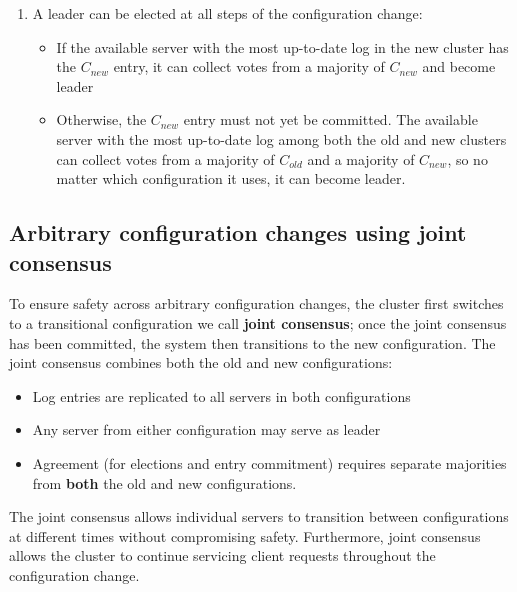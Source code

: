 \documentclass[11pt]{article}
\begin{document}
\begin{enumerate}
\item A leader can be elected at all steps of the configuration change:
\begin{itemize}
\item If the available server with the most up-to-date log in the new cluster has the \(C_{new}\)
entry, it can collect votes from a majority of \(C_{new}\) and become leader
\item Otherwise, the \(C_{new}\) entry must not yet be committed. The available server with the most
up-to-date log among both the old and new clusters can collect votes from a majority of
\(C_{old}\) and a majority of \(C_{new}\), so no matter which configuration it uses, it can
become leader.
\end{itemize}
\end{enumerate}
\subsection{Arbitrary configuration changes using joint consensus}
\label{sec:org8c295a0}
To ensure safety across arbitrary configuration changes, the cluster first switches to a transitional
configuration we call \textbf{joint consensus}; once the joint consensus has been committed, the system then
transitions to the new configuration. The joint consensus combines both the old and new
configurations:
\begin{itemize}
\item Log entries are replicated to all servers in both configurations
\item Any server from either configuration may serve as leader
\item Agreement (for elections and entry commitment) requires separate majorities from \textbf{both} the old and
new configurations.
\end{itemize}

The joint consensus allows individual servers to transition between configurations at different times
without compromising safety. Furthermore, joint consensus allows the cluster to continue servicing
client requests throughout the configuration change.
\end{document}
